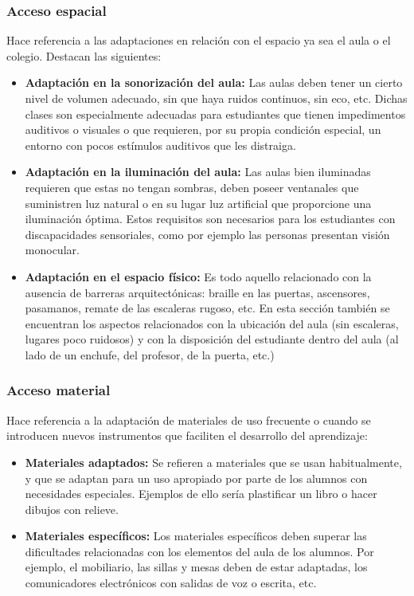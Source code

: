 \subsubsection{Acceso espacial}
Hace referencia a las adaptaciones en relación con el espacio ya sea el aula o el colegio. Destacan las siguientes:
\begin{itemize}
    \item \textbf{Adaptación en la sonorización del aula:} Las aulas deben tener un cierto nivel de volumen adecuado, sin que haya ruidos continuos, sin eco, etc. Dichas clases son especialmente adecuadas para estudiantes que tienen impedimentos auditivos o visuales o que requieren, por su propia condición especial, un entorno con pocos estímulos auditivos que les distraiga.
    \item \textbf{Adaptación en la iluminación del aula:} Las aulas bien iluminadas requieren que estas no tengan sombras, deben poseer ventanales que suministren luz natural o en su lugar luz artificial que proporcione una iluminación óptima. Estos requisitos son necesarios para los estudiantes con discapacidades sensoriales, como por ejemplo las personas presentan visión monocular.
    \item \textbf{Adaptación en el espacio físico:} Es todo aquello relacionado con la ausencia de barreras arquitectónicas:  braille en las puertas, ascensores, pasamanos, remate de las escaleras rugoso, etc. En esta sección también se encuentran los aspectos relacionados con la ubicación del aula (sin escaleras, lugares poco ruidosos) y con la disposición del estudiante dentro del aula (al lado de un enchufe, del profesor, de la puerta, etc.)
\end{itemize}

\subsubsection{Acceso material}
Hace referencia a la adaptación de materiales de uso frecuente o cuando se introducen nuevos instrumentos que faciliten el desarrollo del aprendizaje:
\begin{itemize}
    \item \textbf{Materiales adaptados:} Se refieren a materiales que se usan habitualmente, y que se adaptan para un uso apropiado por parte de los alumnos con necesidades especiales. Ejemplos de ello sería plastificar un libro o hacer dibujos con relieve.
    \item \textbf{Materiales específicos:} Los materiales específicos deben superar las dificultades relacionadas con los elementos del aula de los alumnos. Por ejemplo, el mobiliario, las sillas y mesas deben de estar adaptadas, los comunicadores electrónicos con salidas de voz o escrita, etc.
\end{itemize}

